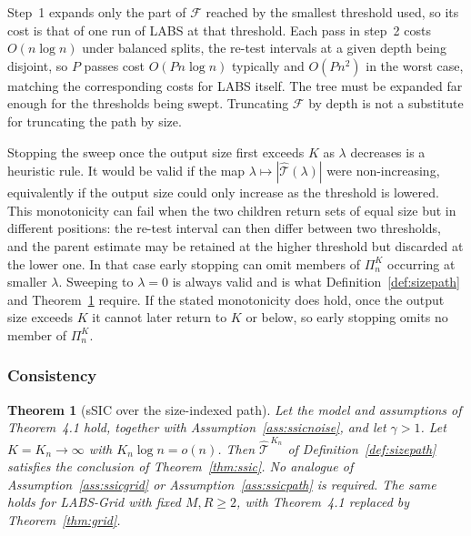 \documentclass[12pt, a4paper]{article}
\newtheorem{theorem}{Theorem}[section]
\newcommand{\mainthm}{Theorem~4.1}
\begin{document}
Step~1 expands only the part of $\mathcal{F}$ reached by the smallest threshold
used, so its cost is that of one run of LABS at that threshold. Each pass in step~2 costs $O(n\log n)$ under balanced splits, the re-test intervals at a given depth being disjoint, so $P$ passes cost $O(Pn\log n)$ typically and $O(Pn^2)$ in the worst case, matching the corresponding costs for LABS itself. The tree must be expanded far
enough for the thresholds being swept. Truncating $\mathcal{F}$ by depth is not a substitute
for truncating the path by size.

Stopping the sweep once the output size first exceeds $K$ as $\lambda$
decreases is a heuristic rule. It would be valid if the map
$\lambda\mapsto|\hat{\mathcal{T}}(\lambda)|$ were non-increasing, equivalently
if the output size could only increase as the threshold is lowered. This
monotonicity can fail when the two children return sets of equal size but in
different positions: the re-test interval can then differ between two
thresholds, and the parent estimate may be retained at the higher threshold
but discarded at the lower one. In that case early stopping can omit members
of $\Pi_n^K$ occurring at smaller $\lambda$. Sweeping to $\lambda=0$ is always
valid and is what Definition~\ref{def:sizepath} and
Theorem~\ref{thm:ssicK} require. If the stated monotonicity does hold, once the
output size exceeds $K$ it cannot later return to $K$ or below, so early
stopping omits no member of $\Pi_n^K$.

\subsubsection*{Consistency}

\begin{theorem}[sSIC over the size-indexed path]
\label{thm:ssicK}
Let the model and assumptions of \mainthm{} hold, together with
Assumption~\ref{ass:ssicnoise}, and let $\gamma > 1$. Let $K = K_n \to \infty$
with $K_n \log n = o(n)$. Then $\hat{\mathcal{T}}^{\,K_n}$ of
Definition~\ref{def:sizepath} satisfies the conclusion of
Theorem~\ref{thm:ssic}. No analogue of Assumption~\ref{ass:ssicgrid} or
Assumption~\ref{ass:ssicpath} is required. The same holds for LABS-Grid with
fixed $M, R \ge 2$, with \mainthm{} replaced by Theorem~\ref{thm:grid}.
\end{theorem}
\end{document}
